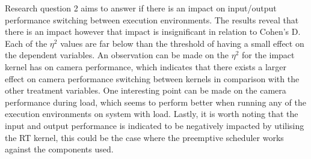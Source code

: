 Research question 2 aims to answer if there is an impact on input/output performance switching between execution environments. The results reveal that there is an impact however that impact is insignificant in relation to Cohen's D. Each of the $\eta^{2}$ values are far below than the threshold of having a small effect on the dependent variables. An observation can be made on the $\eta^{2}$ for the impact kernel has on camera performance, which indicates that there exists a larger effect on camera performance switching between kernels in comparison with the other treatment variables. One interesting point can be made on the camera performance during load, which seems to perform better when running any of the execution environments on system with load. Lastly, it is worth noting that the input and output performance is indicated to be negatively impacted by utilising the RT kernel, this could be the case where the preemptive scheduler works against the components used.